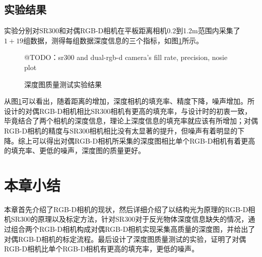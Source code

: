 \subsection{实验结果}
实验分别对SR300和对偶RGB-D相机在平板距离相机0.2到1.2m范围内采集了$1 + 19$组数据，测得每组数据深度信息的三个指标，如图\ref{fig:depth_exp_res}所示。
\begin{figure}
  \centering
  @TODO：sr300 and dual-rgb-d camera's fill rate, precision, nosie plot
  \caption{深度图质量测试实验结果}
  \label{fig:depth_exp_res}
\end{figure}
从图\ref{fig:depth_exp_res}可以看出，随着距离的增加，深度相机的填充率、精度下降，噪声增加。所设计的对偶RGB-D相机相比SR300相机有更高的填充率，与设计时的初衷一致，毕竟结合了两个相机的深度信息，理论上深度信息的填充率就应该有所增加；对偶RGB-D相机的精度与SR300相机相比没有太显著的提升，但噪声有着明显的下降。综上可以得出对偶RGB-D相机所采集的深度图相比单个RGB-D相机有着更高的填充率、更低的噪声，深度图的质量更好。

\section{本章小结}
本章首先介绍了RGB-D相机的现状，然后详细介绍了以结构光为原理的RGB-D相机SR300的原理以及标定方法，针对SR300对于反光物体深度信息缺失的情况，通过组合两个RGB-D相机构成对偶RGB-D相机实现采集高质量的深度图，并给出了对偶RGB-D相机的标定流程。最后设计了深度图质量测试的实验，证明了对偶RGB-D相机比单个RGB-D相机有更高的填充率，更低的噪声。

